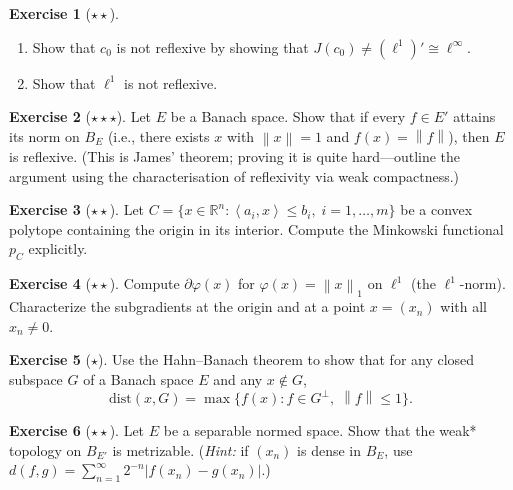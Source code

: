 \documentclass[a4paper,12pt]{book}
\newcommand{\R}{\mathbb{R}}
\newcommand{\norm}[1]{\left\| #1 \right\|}
\newcommand{\abs}[1]{\left| #1 \right|}
\newcommand{\inner}[2]{\left\langle #1, #2 \right\rangle}
\theoremstyle{definition}
\newtheorem{exercise}{Exercise}[chapter]
\theoremstyle{plain}
\theoremstyle{remark}
\begin{document}
\begin{exercise}[$\star\star$]\label{exo:not-reflexive}
\begin{enumerate}[label=(\alph*)]
  \item Show that $c_0$ is not reflexive by showing that $J(c_0)\neq(\ell^1)'
        \cong\ell^\infty$.
  \item Show that $\ell^1$ is not reflexive.
\end{enumerate}
\end{exercise}

\begin{exercise}[$\star\star\star$]\label{exo:james-reflexive}
Let $E$ be a Banach space. Show that if every $f\in E'$ attains its norm on
$B_E$ (i.e., there exists $x$ with $\norm{x}=1$ and $f(x)=\norm{f}$), then
$E$ is reflexive. (This is James' theorem; proving it is quite hard---outline
the argument using the characterisation of reflexivity via weak compactness.)
\end{exercise}

\begin{exercise}[$\star\star$]\label{exo:minkowski-functional-exercise}
Let $C=\{x\in\R^n:\inner{a_i}{x}\leq b_i,\;i=1,\dots,m\}$ be a convex polytope
containing the origin in its interior. Compute the Minkowski functional $p_C$
explicitly.
\end{exercise}

\begin{exercise}[$\star\star$]\label{exo:subdiff-exercise}
Compute $\partial\varphi(x)$ for $\varphi(x)=\norm{x}_1$ on $\ell^1$ (the
$\ell^1$-norm). Characterize the subgradients at the origin and at a point
$x=(x_n)$ with all $x_n\neq 0$.
\end{exercise}

\begin{exercise}[$\star$]\label{exo:HB-quotient}
Use the Hahn--Banach theorem to show that for any closed subspace $G$ of a
Banach space $E$ and any $x\notin G$,
\[
  \mathrm{dist}(x,G) = \max\bigl\{f(x) : f\in G^\perp,\;\norm{f}\leq 1\bigr\}.
\]
\end{exercise}

\begin{exercise}[$\star\star$]\label{exo:weak-star-metriz}
Let $E$ be a separable normed space. Show that the weak* topology on $B_{E'}$
is metrizable. (\emph{Hint:} if $(x_n)$ is dense in $B_E$, use
$d(f,g)=\sum_{n=1}^{\infty}2^{-n}\abs{f(x_n)-g(x_n)}$.)
\end{exercise}
\end{document}
